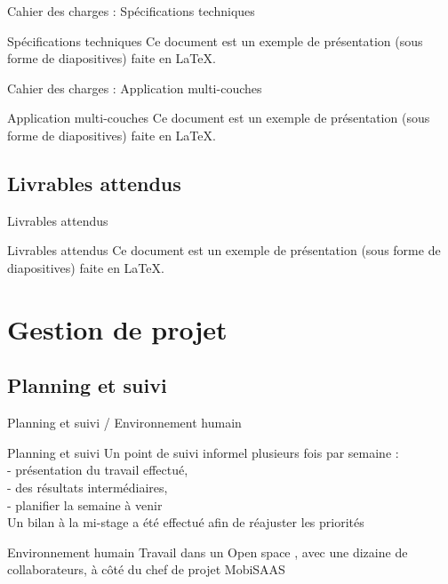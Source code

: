 \documentclass[utf8,compress]{beamer}
\begin{document}
\begin{frame}{Cahier des charges : Spécifications techniques}
\begin{block}{Spécifications techniques}
    Ce document est un exemple de présentation (sous forme de diapositives) faite en LaTeX.
\end{block}
\end{frame}
\begin{frame}{Cahier des charges : Application multi-couches}
\begin{block}{Application multi-couches}
    Ce document est un exemple de présentation (sous forme de diapositives) faite en LaTeX.
\end{block}
\end{frame}
\subsection{Livrables attendus}
\begin{frame}{Livrables attendus}
\begin{block}{Livrables attendus}
    Ce document est un exemple de présentation (sous forme de diapositives) faite en LaTeX.
\end{block}
\end{frame}


\section{Gestion de projet}
\subsection{Planning et suivi }
\begin{frame}{Planning et suivi / Environnement humain }
\begin{block}{Planning et suivi}
Un point de suivi informel plusieurs fois par semaine :\\
	- présentation du travail effectué, \\
	- des résultats intermédiaires,\\ 
	- planifier la semaine à venir\\
	
Un bilan à la mi-stage a été effectué afin de réajuster les priorités
\end{block}
\begin{block}{Environnement humain}
	Travail dans un \og Open space \fg, avec une dizaine de collaborateurs, à côté du chef de projet \og MobiSAAS \fg{} 
\end{block}
\end{frame}
\end{document}
